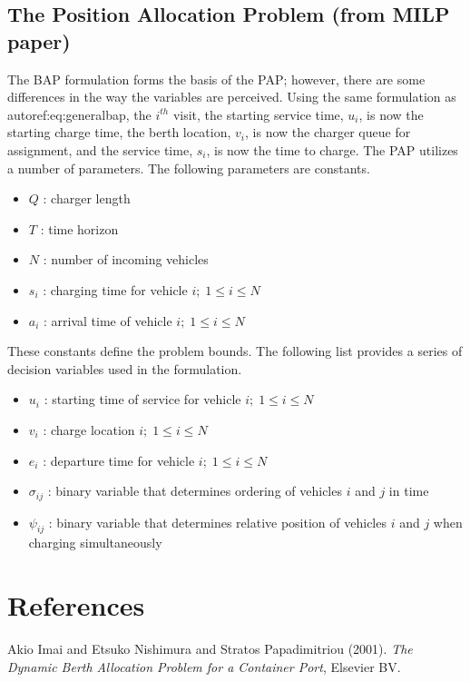 \documentclass[11pt,a4paper,final]{article}
\begin{document}
\subsection{The Position Allocation Problem (from MILP paper)}
\label{sec:org84ad2cc}
The BAP formulation forms the basis of the PAP; however, there are some differences in the way the variables are
perceived. Using the same formulation as autoref:eq:generalbap, the \(i^{th}\) visit, the starting service time, 
\(u_i\), is now the starting charge time, the berth location, \(v_i\), is now the charger queue for assignment, 
and the service time, \(s_i\), is now the time to charge. The PAP utilizes a number of parameters. The following 
parameters are constants.

\begin{itemize}
\item \(Q\)   : charger length
\item \(T\)   : time horizon
\item \(N\)   : number of incoming vehicles
\item \(s_i\) : charging time for vehicle \(i;\; 1 \leq i \leq N\)
\item \(a_i\) : arrival time of vehicle \(i;\; 1 \leq i \leq N\)
\end{itemize}

These constants define the problem bounds. The following list provides a series of decision variables used in the
formulation.

\begin{itemize}
\item \(u_i\)         : starting time of service for vehicle \(i;\; 1 \leq i \leq N\)
\item \(v_i\)         : charge location \(i;\; 1 \leq i \leq N\)
\item \(e_i\)         : departure time for vehicle \(i;\; 1 \leq i \leq N\)
\item \(\sigma_{ij}\) : binary variable that determines ordering of vehicles \(i\) and \(j\) in time
\item \(\psi_{ij}\)   : binary variable that determines relative position of vehicles \(i\) and \(j\) when charging simultaneously
\end{itemize}

\section{References}
\label{sec:orga7cbbd7}
\noindent
Akio Imai and Etsuko Nishimura and Stratos Papadimitriou (2001). \emph{The Dynamic Berth Allocation Problem for a Container Port}, Elsevier {BV}.
\end{document}
